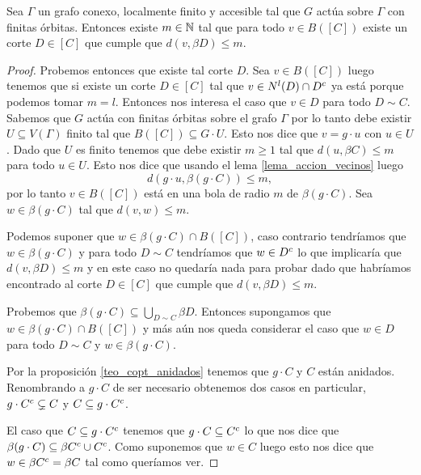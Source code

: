 \documentclass[tesis.tex]{subfiles}
\begin{document}
\begin{lema}\label{lema_existe_m_borde_corte}
	Sea $\Gamma$ un grafo conexo, localmente finito y accesible tal que $G$ actúa sobre $\Gamma$ con finitas órbitas.
	Entonces existe $m \in \mathbb{N}$ tal que para todo $v \in B([C])$ existe un corte $D \in [C]$ que cumple que
	$d(v,\beta D) \le m$.
\end{lema}
\begin{proof}
	Probemos entonces que existe tal corte $D$.
	Sea $v \in B([C])$ luego tenemos que si existe un corte $D \in [C]$ tal que  $v \in N^l(D) \cap D^{c}$ ya está porque podemos tomar $m=l$.
	Entonces nos interesa el caso que $v \in D$ para todo $D \sim C$.
	Sabemos que $G$ actúa con finitas órbitas sobre el grafo $\Gamma$ por lo tanto debe existir $U \subseteq V(\Gamma)$ finito tal que $B([C]) \subseteq G \cdot U$.
	Esto nos dice que $v = g \cdot u$ con $u \in U$.
	Dado que $U$ es finito tenemos que debe existir $m \ge 1$ tal que $d(u,\beta C) \le m$ para todo $u \in U$.
	Esto nos dice que usando el lema \ref{lema_accion_vecinos} luego
	\[
	d(g \cdot u, \beta (g \cdot C)) \le m,
	\]
	por lo tanto $v \in B([C])$ está en una bola de radio $m$ de $\beta (g \cdot C)$.
	Sea $w \in \beta (g \cdot C)$ tal que $d(v,w) \le m$.
	
	Podemos suponer que $w \in \beta (g \cdot C) \cap B([C])$, caso contrario tendríamos que $w \in \beta (g \cdot C)$ y para todo $D \sim C$ tendríamos que $w \in D^{c}$ lo que implicaría  que $d(v,\beta D) \le m$ y en este caso no quedaría nada para probar dado que habríamos encontrado al corte $D \in [C]$ que cumple que $d(v, \beta D) \le m$. 
	
	Probemos que $\beta (g \cdot C) \subseteq \bigcup_{D \sim C} \beta D$.
	Entonces supongamos que $w \in \beta (g \cdot C) \cap B([C])$ y más aún nos queda considerar el caso que $w \in D$ para todo $D \sim C$ y $w \in \beta (g \cdot C)$. 
	
	Por la proposición \ref{teo_copt_anidados} tenemos que $g \cdot C$ y $C$ están anidados.
	Renombrando a $g \cdot C$ de ser necesario obtenemos dos casos en particular, $g \cdot C^{c} \subsetneq C$ y $C \subseteq g \cdot C^{c}$.
	
	El caso que $C \subseteq g \cdot C^{c}$ tenemos que $ g \cdot C \subseteq C^{c}$ lo que nos dice que $\beta (g \cdot C) \subseteq \beta C^{c} \cup C^{c}$.
	Como suponemos que $w \in C$ luego esto nos dice que $w \in \beta C^{c} = \beta C$ tal como queríamos ver.
	

\end{proof}
\end{document}
